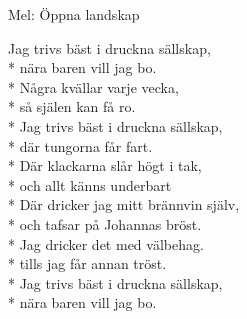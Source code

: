 \begin{SongText}
    \begin{SongInfo}
        Mel: Öppna landskap
    \end{SongInfo}
    \begin{SongVerse}
        Jag trivs bäst i druckna sällskap,\\*%
        nära baren vill jag bo.\\*%
        Några kvällar varje vecka,\\*%
        så själen kan få ro.\\*%
        Jag trivs bäst i druckna sällskap,\\*%
        där tungorna får fart.\\*%
        Där klackarna slår högt i tak,\\*%
        och allt känns underbart\\*%
        Där dricker jag mitt brännvin själv,\\*%
        och tafsar på Johannas bröst.\\*%
        Jag dricker det med välbehag.\\*%
        tills jag får annan tröst.\\*%
        Jag trivs bäst i druckna sällskap,\\*%
        nära baren vill jag bo.
    \end{SongVerse}
\end{SongText}
